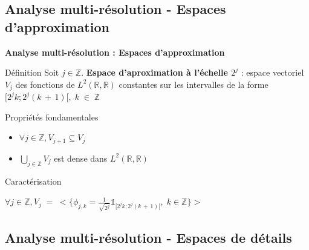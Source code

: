 \documentclass[10pt]{beamer}
\begin{document}
    \subsection{Analyse multi-r\'{e}solution - Espaces d'approximation}
    
      \begin{frame}
      
	\textbf{Analyse multi-r\'{e}solution : Espaces d'approximation}
	
	\begin{beamerboxesrounded}[scheme=def]{D\'{e}finition}
	  Soit $j \in \mathbb{Z}$. \textbf{Espace d'aproximation \`{a} l'\'{e}chelle $ 2 ^ j $} : 
	  espace vectoriel $V_j$ des fonctions de $ L^2(\mathbb{R}, \mathbb{R}) $ constantes sur
	  les intervalles de la forme $ [2^j k; 2^j (k \, + \, 1)[, \; k \; \in \; \mathbb{Z}$
	\end{beamerboxesrounded}
	  
	\begin{beamerboxesrounded}[scheme=theorem]{Propri\'{e}t\'{e}s fondamentales}
	  \begin{itemize}
	    \item $ \forall j \in \mathbb{Z}, V_{j + 1} \subseteq V_j $
	    \item $ \displaystyle \bigcup_{j \in \mathbb{Z}} V_j $ est dense dans $ L^2(\mathbb{R}, \mathbb{R}) $ \\
	  \end{itemize}
	\end{beamerboxesrounded}
	    
	\begin{beamerboxesrounded}[scheme=prop]{Caract\'{e}risation}
	  \begin{center}
	      $ \forall j \in \mathbb{Z}, V_j \; = \; 
	      \Bigg< \Big\{ \phi_{j,k} = \frac{1}{\sqrt{2^j}} \mathbb{1}_{[2^j k; 2^j (k \, + \, 1)[}, \; k \in \mathbb{Z} \Big\} \Bigg> $ 
	  \end{center}
	\end{beamerboxesrounded}
	
      \end{frame}
      
    \subsection{Analyse multi-r\'{e}solution - Espaces de d\'{e}tails}
\end{document}
